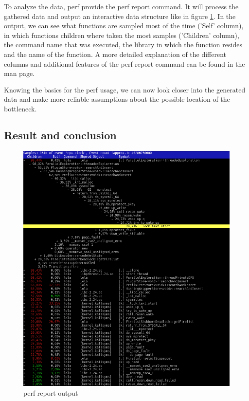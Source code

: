 To analyze the data, perf provide the perf report command. It will process the gathered data and output an interactive data structure like in figure \ref{perf_record_sample}. In the output, we can see what functions are sampled most of the time ('Self' column), in which functions children where taken the most samples ('Children' column), the command name that was executed, the library in which the function resides and the name of the function. A more detailed explanation of the different columns and additional features of the perf report command can be found in the man page.

Knowing the basics for the perf usage, we can now look closer into the generated data and make more reliable assumptions about the possible location of the bottleneck.

\subsection{Result and conclusion}
\label{first_perf_results}
\begin{figure}
    \centering
    \includegraphics[width=\textwidth]{pictures/perfReportSample.png}
    \caption{perf report output}
    \label{perf_record_sample}
\end{figure}
